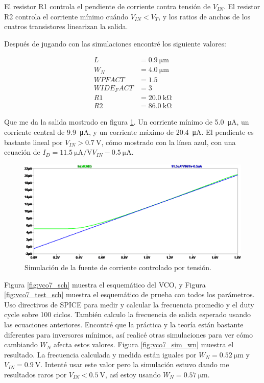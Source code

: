 \documentclass[a4paper]{article}
\begin{document}
El resistor R1 controla el pendiente de corriente contra tensión de $V_{IN}$. El resistor R2 controla el corriente mínimo cuándo $V_{IN} < V_T$, y los ratios de anchos de los cuatros transistores linearizan la salida.

Después de jugando con las simulaciones encontré los siguiente valores:

\begin{align*}
L &= \SI{0.9}{\micro\meter} \\
W_N &= \SI{4.0}{\micro\meter} \\
WPFACT &= 1.5 \\
WIDE_FACT &= 3 \\
R1 &= \SI{20.0}{\kilo\ohm} \\
R2 &= \SI{86.0}{\kilo\ohm}
\end{align*}

Que me da la salida mostrado en figura \ref{fig:current_source_sim}. Un corriente mínimo de \SI{5.0}{\micro\ampere}, un corriente central de \SI{9.9}{\micro\ampere}, y un corriente máximo de \SI{20.4}{\micro\ampere}. El pendiente es bastante lineal por $V_{IN} > \SI{0.7}{\volt}$, cómo mostrado con la línea azul, con una ecuación de $ I_D = \SI[per-mode=symbol]{11.5}{\micro\ampere\per\volt} V_{IN} - \SI{0.5}{\micro\ampere} $.

\begin{figure}[!htb]
\centering
\includegraphics[scale=0.4]{./img/current_source_sim}
\caption{Simulación de la fuente de corriente controlado por tensión.}
\label{fig:current_source_sim}
\end{figure}

Figura \ref{fig:vco7_sch} muestra el esquemático del VCO, y Figura \ref{fig:vco7_test_sch} muestra el esquemático de prueba con todos los parámetros. Uso directivos de SPICE para medir y calcular la frecuencia promedio y el duty cycle sobre 100 ciclos. También calculo la frecuencia de salida esperado usando las ecuaciones anteriores. Encontré que la práctica y la teoría están bastante diferentes para inversores mínimos, así realicé otras simulaciones para ver cómo cambiando $W_N$ afecta estos valores. Figura \ref{fig:vco7_sim_wn} muestra el resultado. La frecuencia calculada y medida están iguales por $W_N = \SI{0.52}{\micro\meter}$ y $V_{IN} = \SI{0.9}{\volt}$. Intenté usar este valor pero la simulación estuvo dando me resultados raros por $V_{IN} < \SI{0.5}{\volt}$, así estoy usando $W_N = \SI{0.57}{\micro\meter}$.
\end{document}

